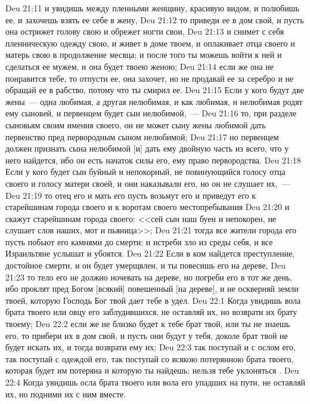 \vs Deu 21:11 и увидишь между пленными женщину, красивую видом, и полюбишь ее, и захочешь взять ее себе в жену,
\vs Deu 21:12 то приведи ее в дом свой, и пусть она острижет голову свою и обрежет ногти свои,
\vs Deu 21:13 и снимет с себя пленническую одежду свою, и живет в доме твоем, и оплакивает отца своего и матерь свою в продолжение месяца; и после того ты можешь войти к ней и сделаться ее мужем, и она будет твоею женою;
\vs Deu 21:14 если же она  не понравится тебе, то отпусти ее,  она захочет, но не продавай ее за серебро и не обращай ее в рабство, потому что ты смирил ее.
\rsbpar\vs Deu 21:15 Если у кого будут две жены~--- одна любимая, а другая нелюбимая, и как любимая,  и нелюбимая родят ему сыновей, и первенцем будет сын нелюбимой,~---
\vs Deu 21:16 то, при разделе сыновьям своим имения своего, он не может сыну жены любимой дать первенство пред первородным сыном нелюбимой;
\vs Deu 21:17 но первенцем должен признать сына нелюбимой [и] дать ему двойную часть из всего, что у него найдется, ибо он есть начаток силы его, ему  право первородства.
\rsbpar\vs Deu 21:18 Если у кого будет сын буйный и непокорный, не повинующийся голосу отца своего и голосу матери своей, и они наказывали его, но он не слушает их,~---
\vs Deu 21:19 то отец его и мать его пусть возьмут его и приведут его к старейшинам города своего и к воротам своего местопребывания
\vs Deu 21:20 и скажут старейшинам города своего: <<сей сын наш буен и непокорен, не слушает слов наших, мот и пьяница>>;
\vs Deu 21:21 тогда все жители города его пусть побьют его камнями до смерти; и  истреби зло из среды себя, и все Израильтяне услышат и убоятся.
\rsbpar\vs Deu 21:22 Если в ком найдется преступление, достойное смерти, и он будет умерщвлен, и ты повесишь его на дереве,
\vs Deu 21:23 то тело его не должно ночевать на дереве, но погреби его в тот же день, ибо проклят пред Богом [всякий] повешенный [на дереве], и не оскверняй земли твоей, которую Господь Бог твой дает тебе в удел.
\vs Deu 22:1 Когда увидишь вола брата твоего или овцу его заблудившихся, не оставляй их, но возврати их брату твоему;
\vs Deu 22:2 если же не близко будет к тебе брат твой, или ты не знаешь его, то прибери их в дом свой, и пусть они будут у тебя, доколе брат твой не будет искать их, и тогда возврати ему их;
\vs Deu 22:3 так поступай и с ослом его, так поступай с одеждой его, так поступай со всякою потерянною  брата твоего, которая будет им потеряна и которую ты найдешь; нельзя тебе уклоняться .
\vs Deu 22:4 Когда увидишь осла брата твоего или вола его упадших на пути, не оставляй их, но подними их с ним вместе.
